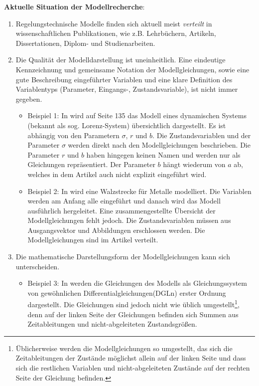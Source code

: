 \textbf{Aktuelle Situation der Modellrecherche}: 
\begin{enumerate}
	\item Regelungstechnische Modelle finden sich aktuell meist \textit{verteilt} in wissenschaftlichen Publikationen, wie z.B. Lehrbüchern, Artikeln, Dissertationen, Diplom- und Studienarbeiten.
	\item Die Qualität der Modelldarstellung ist uneinheitlich. Eine eindeutige Kennzeichnung und gemeinsame Notation der Modellgleichungen, sowie eine gute Beschreibung eingeführter Variablen und eine klare Definition des Variablentyps (Parameter, Eingangs-, Zustandsvariable), ist nicht immer gegeben.
	\begin{itemize}[label=$\bullet$]
		\item Beispiel 1: In \cite{LOR63} wird auf Seite 135 das Modell eines dynamischen Systems (bekannt als sog. \glqq Lorenz-System\grqq) übersichtlich dargestellt. Es ist abhängig von den Parametern $\sigma$, $r$ und $b$. Die Zustandsvariablen und der Parameter $\sigma$ werden direkt nach den Modellgleichungen beschrieben. Die Parameter $r$ und $b$ haben hingegen keinen Namen und werden nur als Gleichungen repräsentiert. Der Parameter $b$ hängt wiederum von $a$ ab, welches in dem Artikel auch nicht explizit eingeführt wird.
		\item Beispiel 2: In \cite{YIFREA09} wird eine Walzstrecke für Metalle modelliert. Die Variablen werden am Anfang alle eingeführt und danach wird das Modell ausführlich hergeleitet. Eine zusammengestellte Übersicht der Modellgleichungen fehlt jedoch. Die Zustandsvariablen müssen aus Ausgangsvektor und Abbildungen erschlossen werden. Die Modellgleichungen sind im Artikel verteilt.
	\end{itemize}
	\item Die mathematische Darstellungsform der Modellgleichungen kann sich unterscheiden.
	\begin{itemize}[label=$\bullet$]
		\item Beispiel 3: In \cite[Seite 14]{SILEEA12} werden die Gleichungen des Modells als Gleichungssystem von gewöhnlichen Differentialgleichungen(DGLn) erster Ordnung dargestellt. Die Gleichungen sind jedoch nicht wie üblich umgestellt\footnote{Üblicherweise werden die Modellgleichungen so umgestellt, das sich die Zeitableitungen der Zustände möglichst allein auf der linken Seite und dass sich die restlichen Variablen und nicht-abgeleiteten Zustände auf der rechten Seite der Gleichung befinden.}, denn auf der linken Seite der Gleichungen befinden sich Summen aus Zeitableitungen und nicht-abgeleiteten Zustandsgrößen.

\end{itemize}
\end{enumerate}
